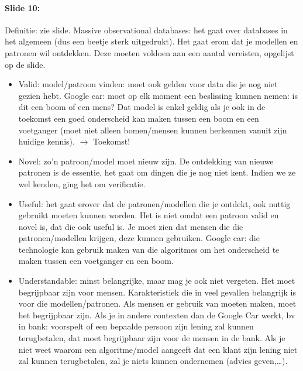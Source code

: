 \documentclass[10pt,a4paper]{report}
\begin{document}
\paragraph{Slide 10:}Definitie: zie slide. Massive observational databases: het gaat over databases in het algemeen (dus een beetje sterk uitgedrukt). Het gaat erom dat je modellen en patronen wil ontdekken. Deze moeten voldoen aan een aantal vereisten, opgelijst op de slide.
\begin{itemize}
\item Valid: model/patroon vinden: moet ook gelden voor data die je nog niet gezien hebt. Google car: moet op elk moment een beslissing kunnen nemen: is dit een boom of een mens? Dat model is enkel geldig als je ook in de toekomst een goed onderscheid kan maken tussen een boom en een voetganger (moet niet alleen bomen/mensen kunnen herkennen vanuit zijn huidige kennis). $\rightarrow$ Toekomst! 
\item Novel: zo'n patroon/model moet nieuw zijn. De ontdekking van nieuwe patronen is de essentie, het gaat om dingen die je nog niet kent. Indien we ze wel kenden, ging het om verificatie. 
\item Useful: het gaat erover dat de patronen/modellen die je ontdekt, ook nuttig gebruikt moeten kunnen worden. Het is niet omdat een patroon valid en novel is, dat die ook useful is. Je moet zien dat mensen die die patronen/modellen krijgen, deze kunnen gebruiken. Google car: die technologie kan gebruik maken van die algoritmes om het onderscheid te maken tussen een voetganger en een boom.
\item Understandable: minst belangrijke, maar mag je ook niet vergeten. Het moet begrijpbaar zijn voor mensen. Karakteristiek die in veel gevallen belangrijk is voor die modellen/patronen. Als mensen er gebruik van moeten maken, moet het begrijpbaar zijn. Als je in andere contexten dan de Google Car werkt, bv in bank: voorspelt of een bepaalde persoon zijn lening zal kunnen terugbetalen, dat moet begrijpbaar zijn voor de mensen in de bank. Als je niet weet waarom een algoritme/model aangeeft dat een klant zijn lening niet zal kunnen terugbetalen, zal je niets kunnen ondernemen (advies geven,…).
\end{itemize}
\end{document}
